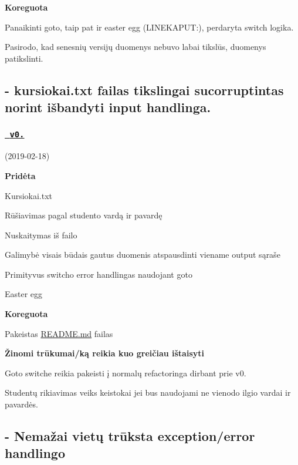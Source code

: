 {\bfseries{Koreguota}}
\begin{DoxyItemize}
\item Panaikinti goto, taip pat ir easter egg (L\+I\+N\+E\+K\+A\+P\+UT\+:), perdaryta switch logika.
\item Pasirodo, kad senesnių versijų duomenys nebuvo labai tikslūs, duomenys patikslinti. \subsection*{-\/ kursiokai.\+txt failas tikslingai sucorruptintas norint išbandyti input handling\textquotesingle{}a. }
\end{DoxyItemize}

\subsubsection*{\href{https://github.com/gitguuddd/Obj_Duomenu_apdorojimas/releases/tag/v0.2}{\texttt{ v0.}}}

(2019-\/02-\/18)

{\bfseries{Pridėta}}
\begin{DoxyItemize}
\item Kursiokai.\+txt
\item Rūšiavimas pagal studento vardą ir pavardę
\item Nuskaitymas iš failo
\item Galimybė visais būdais gautus duomenis atspausdinti viename output sąraše
\item Primityvus switch\textquotesingle{}o error handling\textquotesingle{}as naudojant goto
\item Easter egg
\end{DoxyItemize}

{\bfseries{Koreguota}}
\begin{DoxyItemize}
\item Pakeistas \mbox{\hyperlink{_r_e_a_d_m_e_8md}{R\+E\+A\+D\+M\+E.\+md}} failas
\end{DoxyItemize}

{\bfseries{Žinomi trūkumai/ką reikia kuo greičiau ištaisyti}}
\begin{DoxyItemize}
\item Goto switche reikia pakeisti į normalų refactoringa dirbant prie v0.
\item Studentų rikiavimas veiks keistokai jei bus naudojami ne vienodo ilgio vardai ir pavardės. \subsection*{-\/ Nemažai vietų trūksta exception/error handling\textquotesingle{}o }
\end{DoxyItemize}

